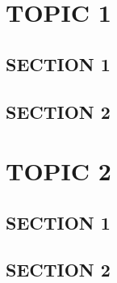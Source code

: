 \appendix
{}
\chapter{\uppercase{Topic 1}}
\section{\uppercase{Section 1}}
\section{\uppercase{Section 2}}
\chapter{\uppercase{Topic 2}}
\section{\uppercase{Section 1}}
\section{\uppercase{Section 2}}



